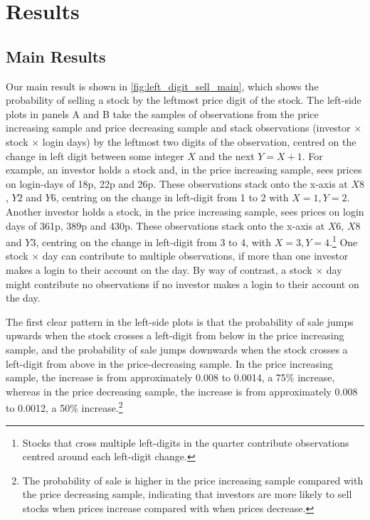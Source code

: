 \section{Results}\label{sec:results_main}

\subsection{Main Results}

Our main result is shown in \ref{fig:left_digit_sell_main}, which shows the probability of selling a stock by the leftmost price digit of the stock. The left-side plots in panels A and B take the samples of observations from the price increasing sample and price decreasing sample and stack observations (investor $\times$ stock $\times$ login days) by the leftmost two digits of the observation, centred on the change in left digit between some integer $X$ and the next $Y = X + 1$. For example, an investor holds a stock and, in the price increasing sample, sees prices on login-days of 18p, 22p and 26p. These observations stack onto the x-axis at $X8$, $Y2$ and $Y6$, centring on the change in left-digit from 1 to 2 with $X = 1 , Y = 2$. Another investor holds a stock, in the price increasing sample, sees prices on login days of 361p, 389p and 430p. These observations stack onto the x-axis at $X6$, $X8$ and $Y3$, centring on the change in left-digit from 3 to 4, with $X = 3 , Y = 4$.\footnote{Stocks that cross multiple left-digits in the quarter contribute observations centred around each left-digit change.} One stock $\times$ day can contribute to multiple observations, if more than one investor makes a login to their account on the day. By way of contrast, a stock $\times$ day might contribute no observations if no investor makes a login to their account on the day.

The first clear pattern in the left-side plots is that the probability of sale jumps upwards when the stock crosses a left-digit from below in the price increasing sample, and the probability of sale jumps downwards when the stock crosses a left-digit from above in the price-decreasing sample. In the price increasing sample, the increase is from approximately 0.008 to 0.0014, a 75\% increase, whereas in the price decreasing sample, the increase is from approximately 0.008 to 0.0012, a 50\% increase.\footnote{The probability of sale is higher in the price increasing sample compared with the price decreasing sample, indicating that investors are more likely to sell stocks when prices increase compared with when prices decrease.} 


